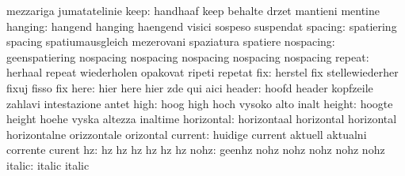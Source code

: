                            mezzariga                 jumatatelinie
                     keep: handhaaf                  keep
                           behalte                   drzet
                           mantieni                  mentine
                  hanging: hangend                   hanging
                           haengend                  visici
                           sospeso                   suspendat
                  spacing: spatiering                spacing
                           spatiumausgleich          mezerovani
                           spaziatura                spatiere
                nospacing: geenspatiering            nospacing
                           nospacing                 nospacing
                           nospacing                 nospacing
                   repeat: herhaal                   repeat
                           wiederholen               opakovat
                           ripeti                    repetat
                      fix: herstel                   fix
                           stellewiederher           fixuj
                           fisso                     fix
                     here: hier                      here
                           hier                      zde
                           qui                       aici
                   header: hoofd                     header
                           kopfzeile                 zahlavi
                           intestazione              antet
                     high: hoog                      high
                           hoch                      vysoko
                           alto                      inalt
                   height: hoogte                    height
                           hoehe                     vyska
                           altezza                   inaltime
               horizontal: horizontaal               horizontal
                           horizontal                horizontalne
                           orizzontale               orizontal
                  current: huidige                   current
                           aktuell                   aktualni
                           corrente                  curent
                       hz: hz                        hz
                           hz                        hz
                           hz                        hz
                     nohz: geenhz                    nohz
                           nohz                      nohz
                           nohz                      nohz
                   italic: italic                    italic
